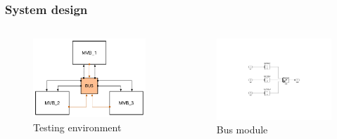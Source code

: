 \documentclass[12pt,beamer]{beamer}
\begin{document}
\begin{frame}
\frametitle{System design}
\begin{columns}[c]
	\begin{column}{.4\textwidth}
		\begin{figure}
		\includegraphics[width=\textwidth]{pic/Test.pdf}
		\caption{Testing environment}
		\end{figure}

		
	\end{column}
	
	\begin{column}{.5\textwidth}
		\begin{figure}
		\includegraphics[width=\textwidth]{pic/bus.pdf}
		\caption{Bus module}
		\end{figure}
	\end{column}
\end{columns}
\end{frame}
\end{document}
